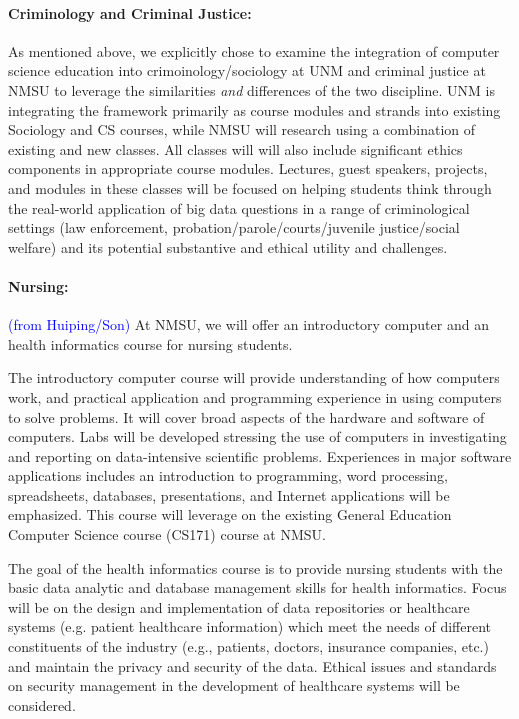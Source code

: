 \paragraph{Criminology and Criminal Justice:} As mentioned above, we explicitly chose to examine the integration of computer science education into crimoinology/sociology at UNM and criminal justice at NMSU to leverage the similarities \emph{and} differences of the two discipline. UNM is integrating the framework primarily as course modules and strands into existing Sociology and CS courses, while NMSU will research using a combination of existing and new classes. All classes will will also include significant ethics components in appropriate course modules. Lectures, guest speakers, projects, and modules in these classes will be focused on helping students think through the real-world application of big data questions in a range of criminological settings (law enforcement, probation/parole/courts/juvenile justice/social welfare) and its potential substantive and ethical utility and challenges.

\paragraph{Nursing:}
\textcolor{blue}{(from Huiping/Son)}
At NMSU, we will offer an introductory computer and an health informatics course for nursing students. 

The introductory computer course will provide understanding of how computers work, and practical application and programming experience in using computers to solve problems. It will cover broad aspects of the hardware and software of computers. Labs will be developed stressing the use of computers in investigating and reporting on data-intensive scientific problems. Experiences in  major software applications includes an introduction to programming, word processing, spreadsheets, databases, presentations, and Internet applications will be emphasized. This course will leverage on the existing General Education Computer Science course (CS171) course at NMSU.    

The goal of the health informatics course is to provide nursing students with the basic data analytic and database management skills for health informatics. Focus will be on the design and implementation of data repositories or healthcare systems (e.g. patient healthcare information) which meet the needs of different constituents of the industry (e.g., patients, doctors, insurance companies, etc.) and maintain the privacy and security of the data. Ethical issues and standards on security management in the development of healthcare systems will be considered. 
 
